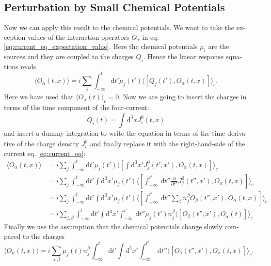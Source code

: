 \documentclass[master,       %
               twoside,        %
               BCOR10mm,       %
               english,ngerman, %
               ]{GAUBM}
\begin{document}
\begin{otherlanguage}{english}
\subsection{Perturbation by Small Chemical Potentials}
Now we can apply this result to the chemical potentials.
We want to take the exception values of the interaction operators $O_\alpha$ in eq. \eqref{eq:current_eq_expectation_value}.
Here the chemical potentials $\mu_i$ are the sources and they are coupled to the charges $Q_i$.
Hence the linear response equations reads
\begin{equation}
	\langle O_\alpha(t, x) \rangle = i \sum_j \int_{-\infty}^t \mathrm{d} t' \mu_j(t') \langle [Q_j(t'), O_\alpha(t, x)] \rangle_c.
\end{equation}
Here we have used that $\langle O_\alpha(t) \rangle_c = 0$.
Now we are going to insert the charges in terms of the time component of the four-current:
\begin{equation}
	Q_i(t) = \int \mathrm{d}^3 x J^0_i(t, x)
\end{equation}
and insert a dummy integration to write the equation in terms of the time derivative of the charge density $\dot{J^0_i}$ and finally replace it with the right-hand-side of the current eq. \eqref{eq:current_eq}:
\begin{align}
	\langle O_\alpha(t, x) \rangle &= i \sum_j \int_{-\infty}^t \mathrm{d} t' \mu_j(t') \langle [\int \mathrm{d}^3 x' J^0_j(t', x'), O_\alpha(t, x)] \rangle_c \nonumber \\
	&= i \sum_j \int_{-\infty}^t \mathrm{d} t' \int \mathrm{d}^3 x'  \mu_j(t') \langle [\int^{t'}_{-\infty} \ \mathrm{d} t'' \frac{\partial}{\partial t''} J^0_j(t'', x'), O_\alpha(t, x)] \rangle_c \nonumber \\
	&= i \sum_j \int_{-\infty}^t \mathrm{d} t' \int \mathrm{d}^3 x'  \mu_j(t') \langle [\int^{t'}_{-\infty} \ \mathrm{d} t'' \sum_\beta n^\beta_j O_\beta(t'', x'), O_\alpha(t, x)] \rangle_c \nonumber \\
	&= i \sum_{j, \beta} \int_{-\infty}^t \mathrm{d} t' \int \mathrm{d}^3 x' \int^{t'}_{-\infty} \ \mathrm{d} t'' \mu_j(t') n^\beta_j \langle [ O_\beta(t'', x'), O_\alpha(t)] \rangle_c
\end{align}
Finally we use the assumption that the chemical potentials change slowly compared to the charges
\begin{equation}
	\langle O_\alpha(t, x) \rangle = i \sum_{j, \beta} \mu_j(t) n^\beta_j  \int_{-\infty}^t \mathrm{d} t' \int \mathrm{d}^3 x' \int^{t'}_{-\infty} \ \mathrm{d} t'' \langle [ O_\beta(t'', x'), O_\alpha(t, x)] \rangle_c.

\end{equation}
\end{otherlanguage}
\end{document}
